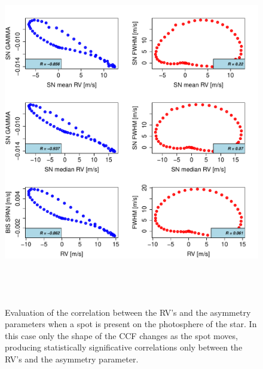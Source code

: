 \documentclass{aa}
\begin{document}
\begin{figure}[htbp]
   \centering
\includegraphics[height = 6in]{SOAP_SPOT_Comparison_para_SN.pdf} 
   \caption{Evaluation of the correlation between the RV's and the asymmetry parameters when a spot is present on the photosphere of the star. In this case only the shape of the CCF changes as the spot moves, producing statistically significative correlations only between the RV's and the asymmetry parameter.}
    \label{fig:spot.corr}
\end{figure}
\end{document}
